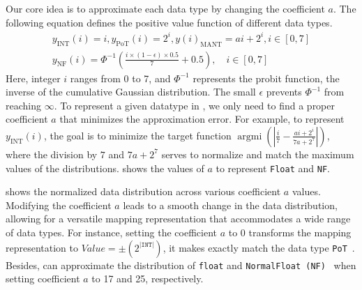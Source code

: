


Our core idea is to approximate each data type by changing the coefficient $a$.
The following equation defines the positive value function of different data types.
\begin{equation}	
\label{eq:fucntion}
    \begin{array}{c}
    y_{\text{INT}}(i) = i, y_{\text{PoT}}(i) = 2^i, y(i)_{\text{MANT}} = ai + 2^i, i \in [0, 7] \\ 
%
    y_{\text{NF}}(i) = \Phi^{-1}\left(\frac{i \times (1-\epsilon) \times 0.5 }{7} + 0.5\right), \quad i \in [0, 7]
\end{array}
\end{equation}
Here, integer $i$ ranges from 0 to 7, and $\Phi^{-1}$ represents the probit function, the inverse of the cumulative Gaussian distribution.
The small $\epsilon$ prevents $\Phi^{-1}$ from reaching $\infty$.
To represent a given datatype in \proj{}, we only need to find a proper coefficient $a$ that minimizes the approximation error.
For example, to represent $y_{\text{INT}}(i)$, the goal is to minimize the target function $\mathop{argmin_a} (|\frac{i}{7} - \frac{ai + 2^i}{7a+2^7}|)$, where the division by $7$ and $7a+2^7$ serves to normalize and match the maximum values of the distributions.
 shows the values of $a$ to represent \texttt{Float} and \texttt{NF}.


 shows the normalized data distribution across various coefficient $a$ values.
Modifying the coefficient $a$ leads to a smooth change in the data distribution, allowing for a versatile mapping representation that accommodates a wide range of data types.
For instance, setting the coefficient $a$ to 0 transforms the mapping representation to $Value = \pm (2^{|\texttt{INT}|})$, it makes \proj exactly match the data type \texttt{PoT}~\cite{miyashita2016convolutional, zhou2017incremental}.
Besides, \proj can approximate the distribution of \texttt{float} and \texttt{NormalFloat (\texttt{NF})}~\cite{dettmers2023qlora} when setting coefficient $a$ to 17 and 25, respectively.


